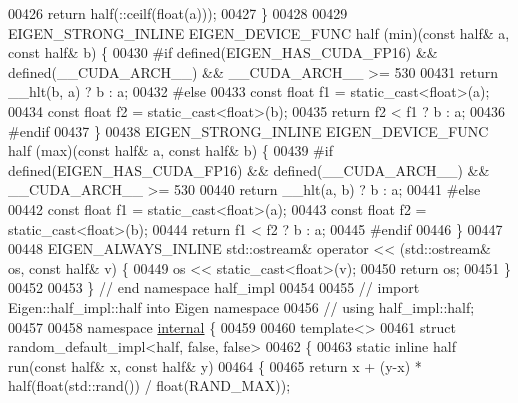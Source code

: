 \begin{DoxyCode}
00426   \textcolor{keywordflow}{return} half(::ceilf(\textcolor{keywordtype}{float}(a)));
00427 \}
00428 
00429 EIGEN\_STRONG\_INLINE EIGEN\_DEVICE\_FUNC half (min)(\textcolor{keyword}{const} half& a, \textcolor{keyword}{const} half& b) \{
00430 \textcolor{preprocessor}{#if defined(EIGEN\_HAS\_CUDA\_FP16) && defined(\_\_CUDA\_ARCH\_\_) && \_\_CUDA\_ARCH\_\_ >= 530}
00431   \textcolor{keywordflow}{return} \_\_hlt(b, a) ? b : a;
00432 \textcolor{preprocessor}{#else}
00433   \textcolor{keyword}{const} \textcolor{keywordtype}{float} f1 = \textcolor{keyword}{static\_cast<}\textcolor{keywordtype}{float}\textcolor{keyword}{>}(a);
00434   \textcolor{keyword}{const} \textcolor{keywordtype}{float} f2 = \textcolor{keyword}{static\_cast<}\textcolor{keywordtype}{float}\textcolor{keyword}{>}(b);
00435   \textcolor{keywordflow}{return} f2 < f1 ? b : a;
00436 \textcolor{preprocessor}{#endif}
00437 \}
00438 EIGEN\_STRONG\_INLINE EIGEN\_DEVICE\_FUNC half (max)(\textcolor{keyword}{const} half& a, \textcolor{keyword}{const} half& b) \{
00439 \textcolor{preprocessor}{#if defined(EIGEN\_HAS\_CUDA\_FP16) && defined(\_\_CUDA\_ARCH\_\_) && \_\_CUDA\_ARCH\_\_ >= 530}
00440   \textcolor{keywordflow}{return} \_\_hlt(a, b) ? b : a;
00441 \textcolor{preprocessor}{#else}
00442   \textcolor{keyword}{const} \textcolor{keywordtype}{float} f1 = \textcolor{keyword}{static\_cast<}\textcolor{keywordtype}{float}\textcolor{keyword}{>}(a);
00443   \textcolor{keyword}{const} \textcolor{keywordtype}{float} f2 = \textcolor{keyword}{static\_cast<}\textcolor{keywordtype}{float}\textcolor{keyword}{>}(b);
00444   \textcolor{keywordflow}{return} f1 < f2 ? b : a;
00445 \textcolor{preprocessor}{#endif}
00446 \}
00447 
00448 EIGEN\_ALWAYS\_INLINE std::ostream& operator << (std::ostream& os, \textcolor{keyword}{const} half& v) \{
00449   os << static\_cast<float>(v);
00450   \textcolor{keywordflow}{return} os;
00451 \}
00452 
00453 \} \textcolor{comment}{// end namespace half\_impl}
00454 
00455 \textcolor{comment}{// import Eigen::half\_impl::half into Eigen namespace}
00456 \textcolor{comment}{// using half\_impl::half;}
00457 
00458 \textcolor{keyword}{namespace }\hyperlink{namespaceinternal}{internal} \{
00459 
00460 \textcolor{keyword}{template}<>
00461 \textcolor{keyword}{struct }random\_default\_impl<half, false, false>
00462 \{
00463   \textcolor{keyword}{static} \textcolor{keyword}{inline} half run(\textcolor{keyword}{const} half& x, \textcolor{keyword}{const} half& y)
00464   \{
00465     \textcolor{keywordflow}{return} x + (y-x) * half(\textcolor{keywordtype}{float}(std::rand()) / float(RAND\_MAX));

\end{DoxyCode}
